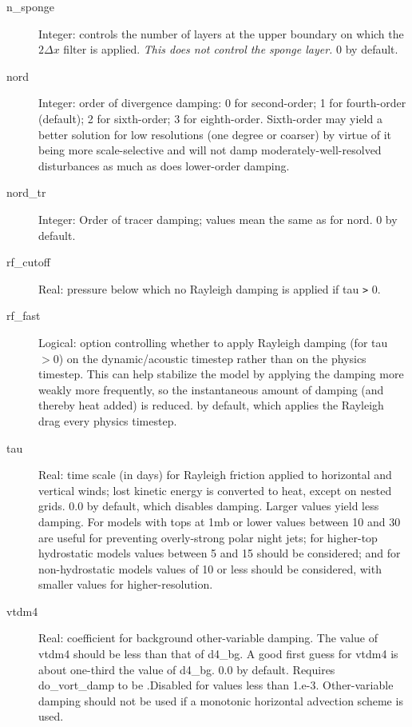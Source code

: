 \documentclass[12pt,letterpaper]{book}
\begin{document}
\begin{description}
\item[n\_sponge] Integer: controls the number of layers at the upper boundary on which the $2\Delta x$ filter is applied. \textit{This does not control the sponge layer.} 0 by default. 


\item[nord] Integer: order of divergence damping: 0 for second-order; 
1 for fourth-order (default); 2 for sixth-order; 3 for eighth-order. Sixth-order may yield a better solution for low resolutions 
(one degree or coarser) by virtue of it being more scale-selective and will not damp moderately-well-resolved disturbances as much as does lower-order damping. 


\item[nord\_tr] Integer: Order of tracer damping; values mean the same as for nord. 
0 by default. 


\item[rf\_cutoff] Real: pressure below which no Rayleigh damping is applied if tau 
\texttt{>} 0.

\item[rf\_fast] Logical: option controlling whether to apply Rayleigh damping (for tau $> 0$) on the dynamic/acoustic timestep rather than on the physics timestep. This can help stabilize the model by applying the damping more weakly more frequently, so the instantaneous amount of damping (and thereby heat added) is reduced.  \false  by default, which applies the Rayleigh drag every physics timestep.

\item[tau] Real: time scale (in days) for Rayleigh friction applied to horizontal and vertical winds; lost kinetic energy is converted to heat, except on nested grids. 
0.0 by default, which disables damping. Larger values yield less damping. For models with tops at 
1{\nobreakspace}mb or lower values between 10 and 30 are useful for preventing overly-strong polar night jets; for higher-top hydrostatic models values between 
5 and 15 should be considered; and for non-hydrostatic models values of 
10 or less should be considered, with smaller values for higher-resolution.

\item[vtdm4] Real: coefficient for background other-variable damping. The value of vtdm4 should be less than that of d4\_bg. A good first guess for vtdm4 is about one-third the value of d4\_bg. 
0.0 by default. Requires do\_vort\_damp to be \true   .Disabled for values less than 1.e-3. Other-variable damping should not be used if a monotonic horizontal advection scheme is used.



\end{description}
\end{document}
